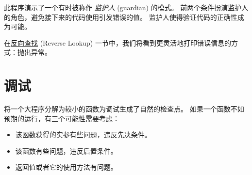 
此程序演示了一个有时被称作 {\em 监护人} (guardian) 的模式。
前两个条件扮演监护人的角色，避免接下来的代码使用引发错误的值。
监护人使得验证代码的正确性成为可能。



在\hyperref[raise]{反向查找} (Reverse Lookup) 一节中，我们将看到更灵活地打印错误信息的方式：抛出异常。

\section{调试}
\label{factdebug}


将一个大程序分解为较小的函数为调试生成了自然的检查点。
如果一个函数不如预期的运行，有三个可能性需要考虑：


\begin{itemize}


\item 该函数获得的实参有些问题，违反先决条件。


\item 该函数有些问题，违反后置条件。


\item 返回值或者它的使用方法有问题。

\end{itemize}

